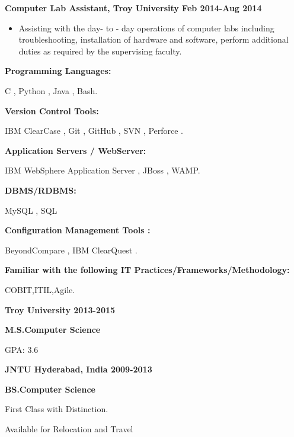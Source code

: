 \documentclass[10.5pt]{article} %
\begin{document}
\smallskip

\noindent \centerline{\large \bf Computer Lab Assistant, Troy University \hfill Feb 2014-Aug 2014}
\begin{itemize}
  \item Assisting with the day- to - day operations of computer labs including troubleshooting, installation of hardware and software, perform additional duties as required by the supervising faculty.
\end{itemize}

\smallskip
\noindent

\noindent %
\begin{itemize}
{\item\bf Programming Languages: }C , Python , Java , Bash.
\smallskip
{\item\bf Version Control Tools: }IBM ClearCase , Git , GitHub , SVN , Perforce .
\smallskip
{\item \bf Application Servers / WebServer: }IBM WebSphere Application Server ,  JBoss , WAMP.
\smallskip
{\item \bf DBMS/RDBMS:} MySQL ,  SQL
\smallskip
{\item\bf Configuration Management Tools :} BeyondCompare , IBM ClearQuest . 
\smallskip
{\item\bf Familiar with the following IT Practices/Frameworks/Methodology: }COBIT,ITIL,Agile.
\smallskip
\end{itemize}
\smallskip

\medskip

\noindent \centerline{\large \bf Troy University \hfill 2013-2015}
\begin{itemize}
  {\item\bf M.S.Computer Science }
  \item GPA: 3.6
\end{itemize}

\noindent \centerline{\large \bf JNTU Hyderabad, India \hfill 2009-2013}
\begin{itemize}
 { \item \bf BS.Computer Science}
  \item First Class with Distinction.
\end{itemize}

\centerline{Available for Relocation and Travel}
\end{document}
